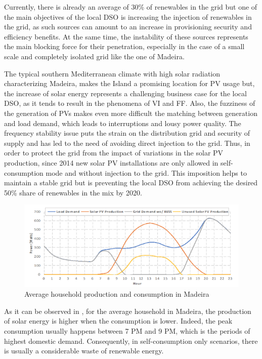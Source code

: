 Currently, there is already an average of 30\% of renewables in the grid but one of the main objectives of the local \ac{DSO} is increasing the injection of renewables in the grid, as such sources can amount to an increase in provisioning security and efficiency benefits. At the same time, the instability of these sources represents the main blocking force for their penetration, especially in the case of a small scale and completely isolated grid like the one of Madeira.


The typical southern Mediterranean climate with high solar radiation characterizing Madeira, makes the Island a promising location for \ac{PV} usage but, the increase of solar energy represents a challenging business case for the local \ac{DSO}, as it tends to result in the phenomena of \ac{VI} and \ac{FF}. Also, the fuzziness of the generation of \acp{PV} makes even more difficult the matching between generation and load demand, which leads to interruptions and lousy power quality. The frequency stability issue puts the strain on the distribution grid and security of supply and has led to the need of avoiding direct injection to the grid. Thus, in order to protect the grid from the impact of variations in the solar \ac{PV} production, since 2014 new solar \ac{PV} installations are only allowed in self-consumption mode and without injection to the grid. This imposition helps to maintain a stable grid but is preventing the local \ac{DSO} from achieving the desired 50\% share of renewables in the mix by 2020.


\begin{figure}[h]
\centering
\includegraphics[width=1\textwidth]{./Images/grafico_intro}
\caption{Average household production and consumption in Madeira}
\label{fig:graph_intro}
\end{figure}

As it can be observed in , for the average household in Madeira, the production of solar energy is higher when the consumption is lower. Indeed, the peak consumption usually happens between 7 PM and 9 PM, which is the periods of highest domestic demand. Consequently, in self-consumption only scenarios, there is usually a considerable waste of renewable energy. 


